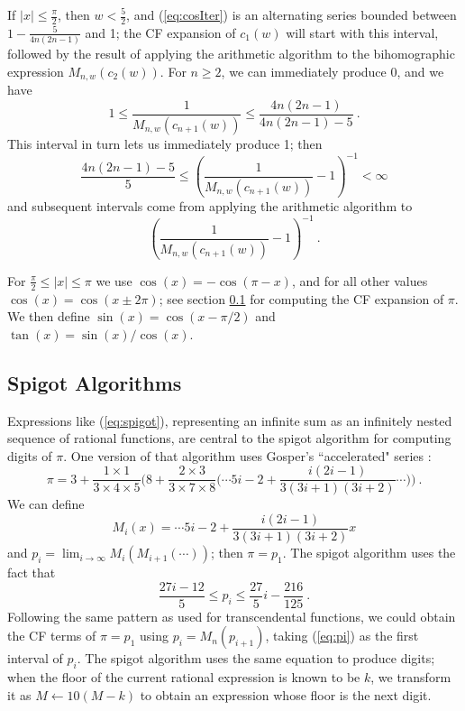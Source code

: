 \documentclass[11pt, oneside]{amsart}   	%
\renewcommand{\:}{\negthickspace:\negthickspace}
\begin{document}
If $|x| \leq \frac{\pi}{2}$, then $w < \frac{5}{2}$, and (\ref{eq:cosIter}) is an alternating series bounded between $1 - \frac{5}{4n(2n-1)}$ and 1; the CF expansion of $c_1(w)$ will start with this interval,  followed by the result of applying the arithmetic algorithm to the bihomographic expression $M_{n,w}(c_2(w))$. For $n \geq 2$, we can immediately produce 0, and we have
\[
1  \leq \frac{1}{M_{n,w}(c_{n+1}(w))} \leq \frac{4n(2n-1)}{4n(2n-1)-5} \ .
\]
This interval in turn lets us immediately produce 1; then
\[
 \frac{4n(2n-1)-5}{5} \leq \left(\frac{1}{M_{n,w}(c_{n+1}(w))} - 1 \right)^{-1} < \infty
\]
and subsequent intervals come from applying the arithmetic algorithm to
\[
\left(\frac{1}{M_{n,w}(c_{n+1}(w))} - 1\right) ^{-1} \ .
\]

For $\frac{\pi}{2} \leq |x| \leq \pi$ we use $\cos(x) = -\cos(\pi - x)$, and for all other values $\cos(x) = \cos(x \pm 2\pi)$; see section \ref{sec:spigot} for computing the CF expansion of $\pi$. We then define $\sin(x) = \cos(x-\pi/2)$ and $\tan(x)=\sin(x)/\cos(x)$.


\subsection{Spigot Algorithms}\label{sec:spigot}
Expressions like (\ref{eq:spigot}), representing an infinite sum as an infinitely nested sequence of rational functions, are central to the spigot algorithm\cite{Gibbons2016,Rabinowitz2016} for computing digits of $\pi$. One version of that algorithm uses Gosper's ``accelerated" series \cite{acceleration}:
\[
\pi = 3 + \frac{1 \times 1}{3 \times 4 \times 5}\big(8 + \frac{2 \times 3}{3 \times 7 \times 8}\big( \cdots 5i-2 + \frac{i(2i-1)}{3(3i+1)(3i+2)} \cdots \big) \big) \ .
\]
We can define
\[
M_i(x) = \cdots 5i-2 + \frac{i(2i-1)}{3(3i+1)(3i+2)}x
\]
and $p_i = \lim_{i \to \infty} M_i(M_{i+1}(\cdots))$;
then $\pi = p_1$. The spigot algorithm uses the fact that
\begin{equation}\label{eq:pi}
\frac{27i-12}{5} \leq p_i \leq \frac{27}{5}i - \frac{216}{125} \ .
\end{equation}
Following the same pattern as used for transcendental functions, we could obtain the CF terms of $\pi = p_1$ using $p_i = M_n(p_{i+1})$, taking (\ref{eq:pi}) as the first interval of $p_i$. The spigot algorithm uses the same equation to produce digits; when the floor of the current rational expression is known to be $k$, we transform it as $M \leftarrow 10(M-k)$ to obtain an expression whose floor is the next digit.
\end{document}
